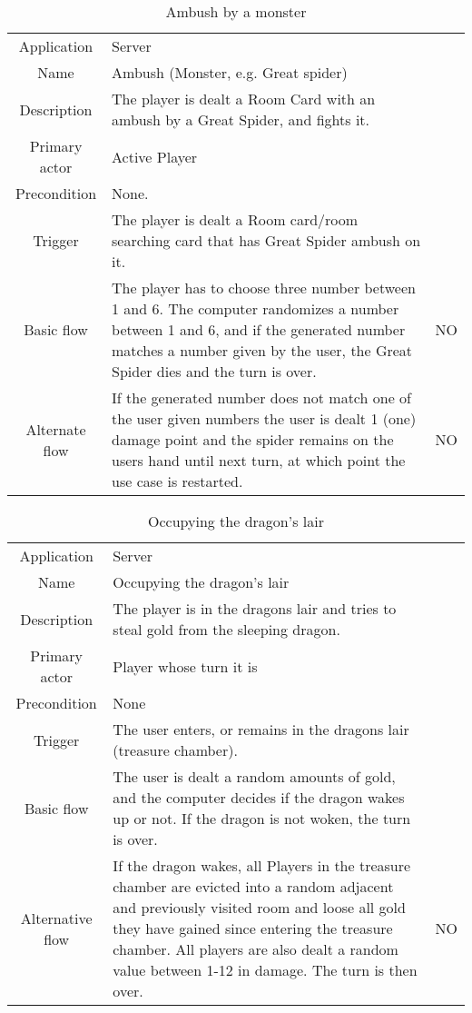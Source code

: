 \begin{table}
\caption{Ambush by a monster}
\label{ambushmonster}
\begin{tabular}{|c| p{9cm}|c}
\hline
Application &	Server & \\
Name & Ambush (Monster, e.g. Great spider)& \\
Description&  The player is dealt a Room Card with an ambush by a Great Spider, and fights it.& \\
Primary actor & Active Player& \\
Precondition &  None.& \\
Trigger & The player is dealt a Room card/room searching card that has Great Spider ambush on it.& \\ \hline
Basic flow & The player has to choose three number between 1 and 6. The computer randomizes a number between 1 and 6, and if the generated number matches a number given by the user, the Great Spider dies and the turn is over. & NO \\ \hline
Alternate flow & If the generated number does not match one of the user given numbers the user is dealt 1 (one) damage point and the spider remains on the users hand until next turn, at which point the use case is restarted. & NO \\
\hline
\end{tabular}
\end{table}


\begin{table}
\caption{Occupying the dragon's lair}
\label{dragonslair}
\begin{tabular}{|c| p{9cm}|c}
\hline
Application &  Server & \\
Name &  Occupying the dragon's lair & \\
Description & The player is in the dragons lair and tries to steal gold from the sleeping dragon. & \\
Primary actor&  Player whose turn it is & \\
Precondition & None & \\
Trigger & The user enters, or remains in the dragons lair (treasure chamber). & \\ \hline
Basic flow & The user is dealt a random amounts of gold, and the computer decides if the dragon wakes up or not. If the dragon is not woken, the turn is over. & \\ \hline
Alternative flow & If the dragon wakes, all Players in the treasure chamber are evicted into a random adjacent and previously visited room and loose all gold they have gained since entering the treasure chamber. All players are also dealt a random value between 1-12 in damage. The turn is then over. & NO \\
\hline
\end{tabular}
\end{table}


